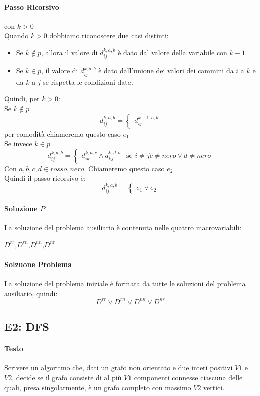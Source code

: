 \documentclass[12pt, a4paper, openany]{book}
\begin{document}
\paragraph*{Passo Ricorsivo} con $k>0$\\
Quando $k>0$ dobbiamo riconoscere due casi distinti:
\begin{itemize}
	\item Se $k\notin p$, allora il valore di $d_{ij}^{k,a,b}$ è dato dal valore della variabile con $k-1$
	\item Se $k \in p$, il valore di $d_{ij}^{k,a,b}$ è dato dall'unione dei valori dei cammini da $i$ a $k$ e da $k$ a $j$ se rispetta le condizioni date.
\end{itemize}
Quindi, per $k>0$:
\\Se $k \notin p$
$$d_{ij}^{k,a,b} = \begin{cases}
		d_{ij}^{k-1,a,b}
	\end{cases}
$$
per comodità chiameremo questo caso $e_1$
\\Se invece $k\in p$
$$d_{ij}^{k,a,b} = \begin{cases}
		d_{ik}^{k,a,c} \wedge d_{kj}^{k,d,b} & \text{se } i\neq j c\neq nero \vee d \neq nero
	\end{cases}
$$
Con $a,b,c,d \in {rosso,nero}$. Chiameremo questo caso $e_2$.
\\Quindi il passo ricorsivo è:
$$
	d_{ij}^{k,a,b} = \begin{cases}
		e_1 \vee e_2
	\end{cases}
$$

\paragraph*{Soluzione $P'$}
La soluzione del problema ausiliario è contenuta nelle quattro macrovariabili:
\begin{center}
	$D^{rr}$,$D^{rn}$,$D^{nn}$,$D^{nr}$
\end{center}
\paragraph*{Solzuone Problema}
La soluzione del problema iniziale è formata da tutte le soluzioni del problema ausiliario, quindi:
$$
	D^{rr}\vee D^{rn}\vee D^{nn}\vee D^{nr}
$$

\subsection{E2: DFS}
\paragraph*{Testo}
Scrivere un algoritmo che, dati un grafo non orientato e due interi positivi $V1$ e $V2$,
decide se il grafo consiste di al più $V1$ componenti connesse ciascuna delle quali, presa singolarmente, è un grafo completo con massimo $V2$ vertici.
\end{document}
